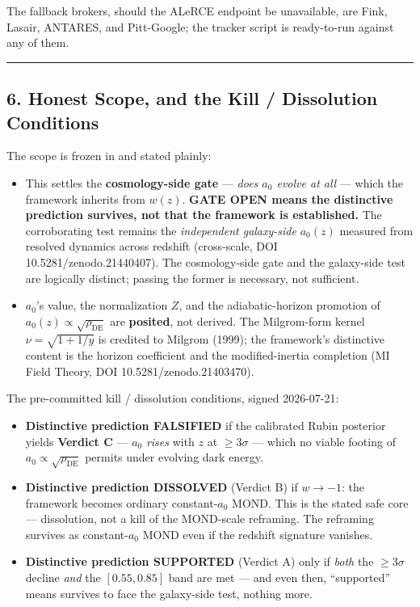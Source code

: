 \documentclass[
]{article}
\providecommand{\tightlist}{%
  \setlength{\itemsep}{0pt}\setlength{\parskip}{0pt}}
\begin{document}
The fallback brokers, should the ALeRCE endpoint be unavailable, are
Fink, Lasair, ANTARES, and Pitt-Google; the tracker script is
ready-to-run against any of them.

\begin{center}\rule{0.5\linewidth}{0.5pt}\end{center}

\subsection{6. Honest Scope, and the Kill / Dissolution
Conditions}\label{honest-scope-and-the-kill-dissolution-conditions}

The scope is frozen in and stated plainly:

\begin{itemize}
\tightlist
\item
  This settles the \textbf{cosmology-side gate} --- \emph{does \(a_0\)
  evolve at all} --- which the framework inherits from \(w(z)\).
  \textbf{GATE OPEN means the distinctive prediction survives, not that
  the framework is established.} The corroborating test remains the
  \emph{independent galaxy-side} \(a_0(z)\) measured from resolved
  dynamics across redshift (cross-scale, DOI 10.5281/zenodo.21440407).
  The cosmology-side gate and the galaxy-side test are logically
  distinct; passing the former is necessary, not sufficient.
\item
  \(a_0\)'s value, the normalization \(Z\), and the adiabatic-horizon
  promotion of \(a_0(z)\propto\sqrt{\rho_\mathrm{DE}}\) are
  \textbf{posited}, not derived. The Milgrom-form kernel
  \(\nu=\sqrt{1+1/y}\) is credited to Milgrom (1999); the framework's
  distinctive content is the horizon coefficient and the
  modified-inertia completion (MI Field Theory, DOI
  10.5281/zenodo.21403470).
\end{itemize}

The pre-committed kill / dissolution conditions, signed 2026-07-21:

\begin{itemize}
\tightlist
\item
  \textbf{Distinctive prediction FALSIFIED} if the calibrated Rubin
  posterior yields \textbf{Verdict C} --- \(a_0\) \emph{rises} with
  \(z\) at \(\ge3\sigma\) --- which no viable footing of
  \(a_0\propto\sqrt{\rho_\mathrm{DE}}\) permits under evolving dark energy.
\item
  \textbf{Distinctive prediction DISSOLVED} (Verdict B) if \(w\to-1\):
  the framework becomes ordinary constant-\(a_0\) MOND. This is the
  stated safe core --- dissolution, not a kill of the MOND-scale
  reframing. The reframing survives as constant-\(a_0\) MOND even if the
  redshift signature vanishes.
\item
  \textbf{Distinctive prediction SUPPORTED} (Verdict A) only if
  \emph{both} the \(\ge3\sigma\) decline \emph{and} the \([0.55,0.85]\)
  band are met --- and even then, ``supported'' means survives to face
  the galaxy-side test, nothing more.
\end{itemize}
\end{document}

